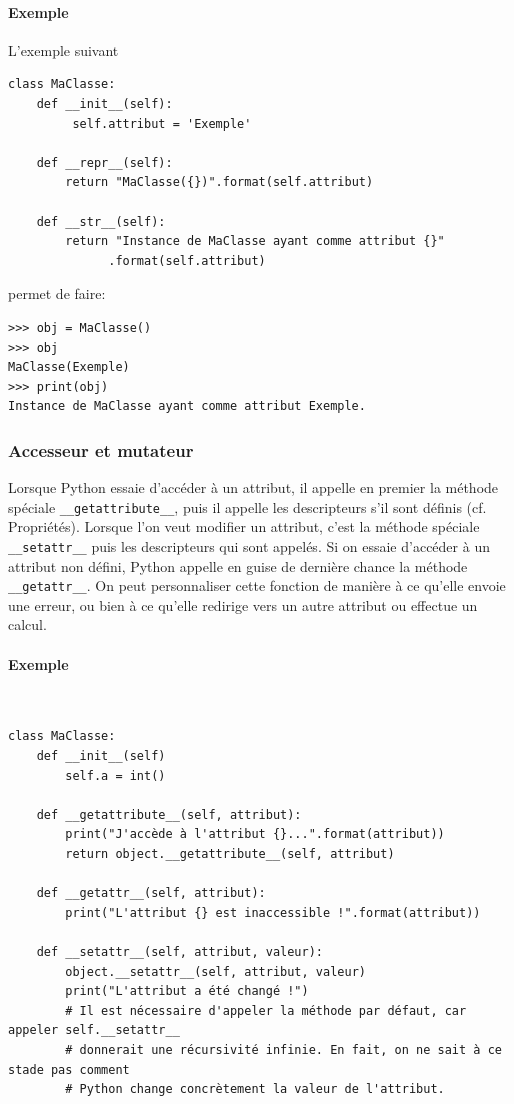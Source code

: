 \documentclass[a4paper, 10pt]{article}
\newcommand{\code}[1]{{\small\texttt{#1}}}
\begin{document}
\paragraph{Exemple} L'exemple suivant
\begin{verbatim}
class MaClasse:
    def __init__(self):
         self.attribut = 'Exemple'

    def __repr__(self):
        return "MaClasse({})".format(self.attribut)

    def __str__(self):
        return "Instance de MaClasse ayant comme attribut {}"
              .format(self.attribut)
\end{verbatim}
permet de faire:
\begin{Verbatim}[fontsize = \footnotesize, frame = single]
>>> obj = MaClasse()
>>> obj
MaClasse(Exemple)
>>> print(obj)
Instance de MaClasse ayant comme attribut Exemple.
\end{Verbatim}

\subsubsection{Accesseur et mutateur}
Lorsque Python essaie d'accéder à un attribut, il appelle en premier la méthode spéciale \code{\_\_getattribute\_\_}\index{\code{\_\_getattribute\_\_}}, puis il appelle les descripteurs s'il sont définis (cf. Propriétés). Lorsque l'on veut modifier un attribut, c'est la méthode spéciale \code{\_\_setattr\_\_}\index{\code{\_\_setattr\_\_}} puis les descripteurs qui sont appelés. Si on essaie d'accéder à un attribut non défini, Python appelle en guise de dernière chance la méthode \code{\_\_getattr\_\_}\index{\code{\_\_getattr\_\_}}. On peut personnaliser cette fonction de manière à ce qu'elle envoie une erreur, ou bien à ce qu'elle redirige vers un autre attribut ou effectue un calcul.

\paragraph{Exemple}~

\begin{verbatim}
class MaClasse:
    def __init__(self)
        self.a = int()

    def __getattribute__(self, attribut):
        print("J'accède à l'attribut {}...".format(attribut))
        return object.__getattribute__(self, attribut)

    def __getattr__(self, attribut):
        print("L'attribut {} est inaccessible !".format(attribut))

    def __setattr__(self, attribut, valeur):
        object.__setattr__(self, attribut, valeur)
        print("L'attribut a été changé !")
        # Il est nécessaire d'appeler la méthode par défaut, car appeler self.__setattr__
        # donnerait une récursivité infinie. En fait, on ne sait à ce stade pas comment
        # Python change concrètement la valeur de l'attribut.
\end{verbatim}
\end{document}
